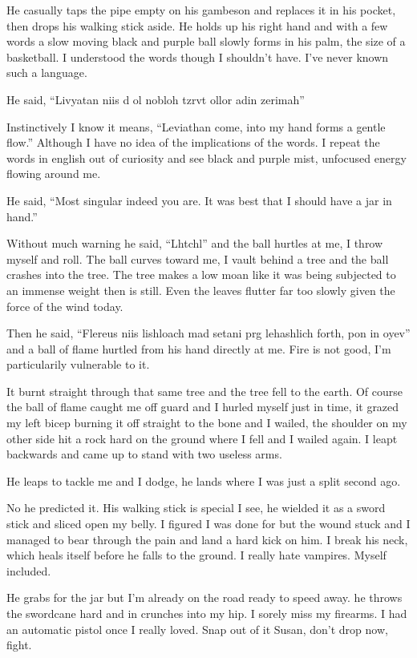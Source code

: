 He casually taps the pipe empty on his gambeson and replaces it in his pocket, then drops his walking stick aside. He holds up his right hand and with a few words a slow moving black and purple ball slowly forms in his palm, the size of a basketball. I understood the words though I shouldn't have. I've never known such a language.

He said, ``Livyatan niis d ol nobloh tzrvt ollor adin zerimah''

Instinctively I know it means, ``Leviathan come, into my hand forms a gentle flow.'' Although I have no idea of the implications of the words. I repeat the words in english out of curiosity and see black and purple mist, unfocused energy flowing around me.

He said, ``Most singular indeed you are. It was best that I should have a jar in hand.''

Without much warning he said, ``Lhtchl'' and the ball hurtles at me, I throw myself and roll. The ball curves toward me, I vault behind a tree and the ball crashes into the tree. The tree makes a low moan like it was being subjected to an immense weight then is still. Even the leaves flutter far too slowly given the force of the wind today.

Then he said, ``Flereus niis lishloach mad setani prg lehashlich forth, pon in oyev'' and a ball of flame hurtled from his hand directly at me. Fire is not good, I'm particularily vulnerable to it.

It burnt straight through that same tree and the tree fell to the earth. Of course the ball of flame caught me off guard and I hurled myself just in time, it grazed my left bicep burning it off straight to the bone and I wailed, the shoulder on my other side hit a rock hard on the ground where I fell and I wailed again. I leapt backwards and came up to stand with two useless arms.

He leaps to tackle me and I dodge, he lands where I was just a split second ago.

No he predicted it. His walking stick is special I see, he wielded it as a sword stick and sliced open my belly. I figured I was done for but the wound stuck and I managed to bear through the pain and land a hard kick on him. I break his neck, which heals itself before he falls to the ground. I really hate vampires. Myself included.

He grabs for the jar but I'm already on the road ready to speed away. he throws the swordcane hard and in crunches into my hip. I sorely miss my firearms. I had an automatic pistol once I really loved. Snap out of it Susan, don't drop now, fight.


